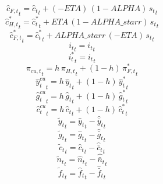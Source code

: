 \begin{dmath}
{{\hat c_{F,t}}}_{t}={{\hat c_t}}_{t}+\left(-{ETA}\right)\, \left(1-{ALPHA}\right)\, {{s_t}}_{t}
\end{dmath}
\begin{dmath}
{{\hat c_{H,t}^*}}_{t}={{\hat c_t^*}}_{t}+{ETA}\, \left(1-{ALPHA\_starr}\right)\, {{s_t}}_{t}
\end{dmath}
\begin{dmath}
{{\hat c_{F,t}^*}}_{t}={{\hat c_t^*}}_{t}+{ALPHA\_starr}\, \left(-{ETA}\right)\, {{s_t}}_{t}
\end{dmath}
\begin{dmath}
{{i_t}}_{t}={{i_t}}_{t}
\end{dmath}
\begin{dmath}
{{i_t^*}}_{t}={{i_t}}_{t}
\end{dmath}
\begin{dmath}
{{\pi_{cu,t}}}_{t}={h}\, {{\pi_{H,t}}}_{t}+\left(1-{h}\right)\, {{\pi_{F,t}^*}}_{t}
\end{dmath}
\begin{dmath}
{{\hat y_t^{cu}}}_{t}={h}\, {{\hat y_t}}_{t}+\left(1-{h}\right)\, {{\hat y_t^*}}_{t}
\end{dmath}
\begin{dmath}
{{\hat g_t^{cu}}}_{t}={h}\, {{\hat g_t}}_{t}+\left(1-{h}\right)\, {{\hat g_t^*}}_{t}
\end{dmath}
\begin{dmath}
{{\hat c_t^{cu}}}_{t}={h}\, {{\hat c_t}}_{t}+\left(1-{h}\right)\, {{\hat c_t^*}}_{t}
\end{dmath}
\begin{dmath}
{{\tilde y_t}}_{t}={{\hat y_t}}_{t}-{{\hat {\bar y}_t}}_{t}
\end{dmath}
\begin{dmath}
{{\tilde g_t}}_{t}={{\hat g_t}}_{t}-{{\hat {\bar g}_t}}_{t}
\end{dmath}
\begin{dmath}
{{\tilde c_t}}_{t}={{\hat c_t}}_{t}-{{\hat {\bar c}_t}}_{t}
\end{dmath}
\begin{dmath}
{{\tilde n_t}}_{t}={{\hat n_t}}_{t}-{{\hat {\bar n}_t}}_{t}
\end{dmath}
\begin{dmath}
{{\tilde f_t}}_{t}={{\hat f_t}}_{t}-{{\hat {\bar f}_t}}_{t}
\end{dmath}
